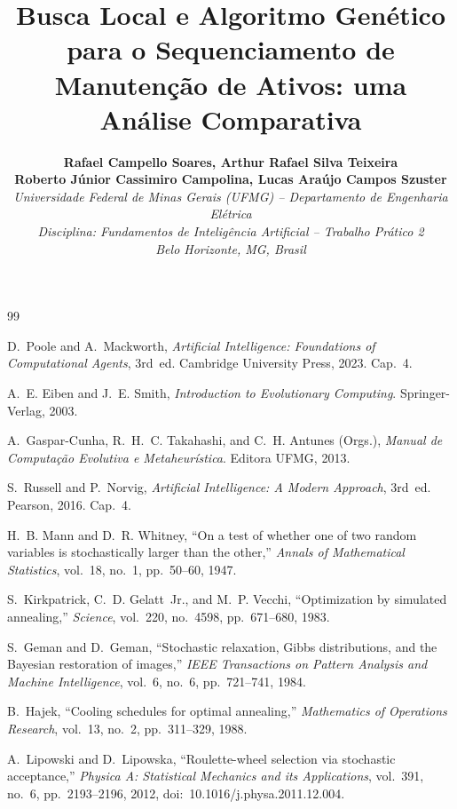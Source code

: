 \documentclass[10pt,twocolumn,a4paper]{article}
\title{\vspace{-1.5cm}\textbf{Busca Local e Algoritmo Genético para o Sequenciamento de Manutenção de Ativos: uma Análise Comparativa}}
\author{
    \textbf{Rafael Campello Soares, Arthur Rafael Silva Teixeira}\\
    \textbf{Roberto Júnior Cassimiro Campolina, Lucas Araújo Campos Szuster}\\
    \textit{Universidade Federal de Minas Gerais (UFMG) -- Departamento de Engenharia Elétrica}\\
    \textit{Disciplina: Fundamentos de Inteligência Artificial -- Trabalho Prático 2}\\
    \textit{Belo Horizonte, MG, Brasil}
}
\date{}
\begin{document}
\maketitle









\begin{thebibliography}{99}

D.~Poole and A.~Mackworth, \textit{Artificial Intelligence: Foundations of Computational Agents}, 3rd~ed. Cambridge University Press, 2023. Cap.~4.

A.~E. Eiben and J.~E. Smith, \textit{Introduction to Evolutionary Computing}. Springer-Verlag, 2003.

A.~Gaspar-Cunha, R.~H.~C. Takahashi, and C.~H. Antunes (Orgs.), \textit{Manual de Computação Evolutiva e Metaheurística}. Editora UFMG, 2013.

S.~Russell and P.~Norvig, \textit{Artificial Intelligence: A Modern Approach}, 3rd~ed. Pearson, 2016. Cap.~4.

H.~B. Mann and D.~R. Whitney, ``On a test of whether one of two random variables is stochastically larger than the other,'' \textit{Annals of Mathematical Statistics}, vol.~18, no.~1, pp.~50--60, 1947.

S.~Kirkpatrick, C.~D. Gelatt~Jr., and M.~P. Vecchi, ``Optimization by simulated annealing,'' \textit{Science}, vol.~220, no.~4598, pp.~671--680, 1983.

S.~Geman and D.~Geman, ``Stochastic relaxation, Gibbs distributions, and the Bayesian restoration of images,'' \textit{IEEE Transactions on Pattern Analysis and Machine Intelligence}, vol.~6, no.~6, pp.~721--741, 1984.

B.~Hajek, ``Cooling schedules for optimal annealing,'' \textit{Mathematics of Operations Research}, vol.~13, no.~2, pp.~311--329, 1988.

A.~Lipowski and D.~Lipowska, ``Roulette-wheel selection via stochastic acceptance,'' \textit{Physica A: Statistical Mechanics and its Applications}, vol.~391, no.~6, pp.~2193--2196, 2012, doi:~10.1016/j.physa.2011.12.004.

\end{thebibliography}


\end{document}

